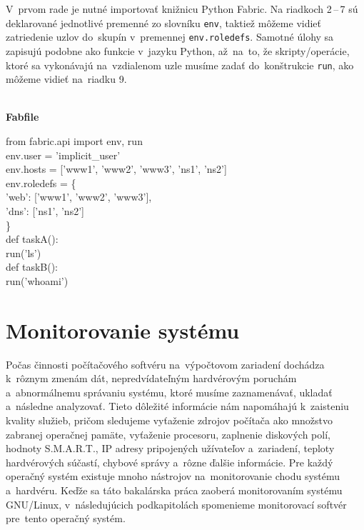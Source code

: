 V~prvom rade je nutné importovať knižnicu \mbox{Python} Fabric. Na riadkoch 2\,--\,7 sú deklarované jednotlivé premenné zo slovníku \texttt{env}, taktiež môžeme vidieť zatriedenie uzlov do~skupín v~premennej \texttt{env.roledefs}. Samotné úlohy sa zapisujú podobne ako funkcie v~jazyku \mbox{Python}, až~na~to, že skripty/operácie, ktoré sa vykonávajú na~vzdialenom uzle musíme zadať do~konštrukcie \texttt{run}, ako môžeme vidieť na~riadku 9.\\\\

\begin{algorithm}[H]
	\caption{{\bf Fabfile} \label{fabfile}}
	
	from fabric.api import env, run\\
	
	env.user = 'implicit\_user'\\
	env.hosts = ['www1', 'www2', 'www3', 'ns1', 'ns2']\\
	
	env.roledefs = \{\\
	\hspace{1.5em}	'web': ['www1', 'www2', 'www3'],\\
	\hspace{1.5em}	'dns': ['ns1', 'ns2']\\
	\}\\
	def taskA():\\
	\hspace{1.5em}run('ls')\\
	
	def taskB():\\
	\hspace{1.5em}run('whoami')\\
\end{algorithm} 

\chapter{Monitorovanie systému}
\label{monitorovanie}
Počas činnosti počítačového softvéru na~výpočtovom zariadení dochádza k~rôznym zmenám dát, nepredvídateľným hardvérovým poruchám a~abnormálnemu správaniu systému, ktoré musíme zaznamenávať, ukladať a~následne analyzovať. Tieto dôležité informácie nám napomáhajú k~zaisteniu kvality služieb, pričom sledujeme vyťaženie zdrojov počítača ako množstvo zabranej operačnej pamäte, vyťaženie procesoru, zaplnenie diskových polí, hodnoty S.M.A.R.T., IP adresy pripojených užívateľov a~zariadení, teploty hardvérových súčastí, chybové správy a~rôzne ďalšie informácie. Pre každý operačný systém existuje mnoho nástrojov na~monitorovanie chodu systému a~hardvéru. Keďže sa táto bakalárska práca zaoberá monitorovaním systému GNU/Linux, v~následujúcich podkapitolách spomenieme monitorovací softvér pre~tento operačný systém. 

